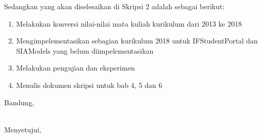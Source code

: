 \documentclass[a4paper,twoside]{article}
\begin{document}
Sedangkan yang akan diselesaikan di Skripsi 2 adalah sebagai berikut:
\begin{enumerate}
\item Melakukan konversi nilai-nilai mata kuliah kurikulum dari 2013 ke 2018
\item Mengimpelementasikan sebagian kurikulum 2018 untuk IFStudentPortal dan SIAModels yang belum diimpelementasikan
\item Melakukan pengujian dan eksperimen
\item Menulis dokumen skripsi untuk bab 4, 5 dan 6
\end{enumerate}

\vspace{1cm}
\centering Bandung, \tanggal\\
\vspace{2cm} \nama \\ 
\vspace{1cm}

Menyetujui, \\
\end{document}
